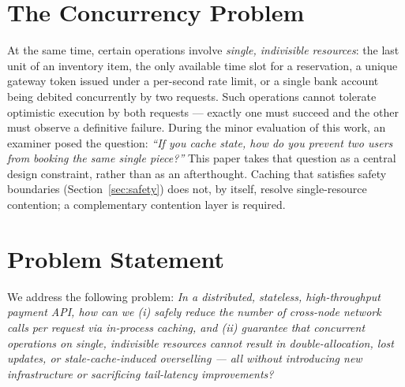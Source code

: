 \documentclass[12pt,a4paper,oneside]{report}
\begin{document}
\section{The Concurrency Problem}
At the same time, certain operations involve \emph{single, indivisible resources}: the last unit of an inventory item, the only available time slot for a reservation, a unique gateway token issued under a per-second rate limit, or a single bank account being debited concurrently by two requests. Such operations cannot tolerate optimistic execution by both requests --- exactly one must succeed and the other must observe a definitive failure. During the minor evaluation of this work, an examiner posed the question: \emph{``If you cache state, how do you prevent two users from booking the same single piece?''} This paper takes that question as a central design constraint, rather than as an afterthought. Caching that satisfies safety boundaries (Section~\ref{sec:safety}) does not, by itself, resolve single-resource contention; a complementary contention layer is required.

\section{Problem Statement}
We address the following problem: \emph{In a distributed, stateless, high-throughput payment API, how can we (i) safely reduce the number of cross-node network calls per request via in-process caching, and (ii) guarantee that concurrent operations on single, indivisible resources cannot result in double-allocation, lost updates, or stale-cache-induced overselling --- all without introducing new infrastructure or sacrificing tail-latency improvements?}
\end{document}
